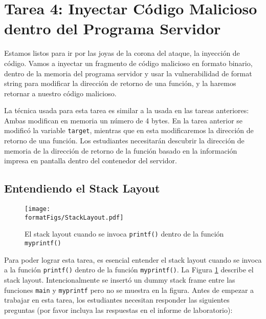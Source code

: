 \section{Tarea 4: Inyectar Código Malicioso dentro del Programa Servidor}

Estamos listos para ir por las joyas de la corona del ataque, la inyección de código.
Vamos a inyectar un fragmento de código malicioso en formato binario, dentro de la memoria del programa servidor y usar la vulnerabilidad de format string para modificar la dirección de retorno de una función, y la haremos retornar a nuestro código malicioso.

La técnica usada para esta tarea es similar a la usada en las tareas anteriores:
Ambas modifican en memoria un número de 4 bytes. En la tarea anterior se modificó la variable \texttt{target}, mientras que en esta modificaremos la dirección de retorno de una función. Los estudiantes necesitarán descubrir la dirección de memoria de la dirección de retorno de la función basado en la información impresa en pantalla dentro del contenedor del servidor.



\subsection{Entendiendo el Stack Layout} 

\begin{figure}[htb]
\begin{center}
\texttt{[image: \\formatFigs/StackLayout.pdf]}
\end{center}
\caption{El stack layout cuando se invoca \texttt{printf()}
dentro de la función \texttt{myprintf()}}
\label{format:fig:stacklayout}
\end{figure}

Para poder lograr esta tarea, es esencial entender el stack layout cuando se invoca a la función \texttt{printf()} dentro de la función \texttt{myprintf()}.
La Figura \ref{format:fig:stacklayout} describe el stack layout.
Intencionalmente se insertó un dummy stack frame entre las funciones \texttt{main} y \texttt{myprintf} pero no se muestra en la figura. Antes de empezar a trabajar en esta tarea, los estudiantes necesitan responder las siguientes preguntas (por favor incluya las respuestas en el informe de laboratorio):


